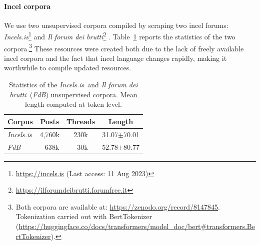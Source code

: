 \documentclass[11pt]{article}
\newcommand{\enforum}{\textit{Incels.is}}
\newcommand{\itforum}{\textit{Il forum dei brutti}}
\begin{document}
\paragraph{Incel corpora}
We use two unsupervised corpora compiled by scraping two incel forums: \textit{\enforum}\footnote{\url{https://incels.is} (Last access: 11 Aug 2023)} and \textit{\itforum}\footnote{\url{https://ilforumdeibrutti.forumfree.it}} \cite{gajo2023identification}.
Table~\ref{tab:english-italian-unsupervised-datasets-stats} reports the statistics of the two corpora.\footnote{Both corpora are available at: \url{https://zenodo.org/record/8147845}. Tokenization carried out with BertTokenizer (\url{https://huggingface.co/docs/transformers/model_doc/bert#transformers.BertTokenizer}).}
These resources were created both due to the lack of freely available incel corpora and the fact that incel language changes rapidly,
making it worthwhile to compile updated resources.

\renewcommand{\arraystretch}{0.9}

\begin{table}[t]
  \centering
  \caption{Statistics of the \enforum\, and \itforum\, (\textit{FdB}) unsupervised corpora. Mean length computed at token level.}
  \begin{tabular}{l|ccc}
      \hline
      \textbf{Corpus} & \textbf{Posts} & \textbf{Threads} & \textbf{Length} \\
      \hline
      \enforum & 4,760k & 230k & 31.07$\pm$70.01 \\
      \textit{FdB} & \,\,\,\,638k & \,\,\,30k & 52.78$\pm$80.77 \\
      \hline
  \end{tabular}
  \label{tab:english-italian-unsupervised-datasets-stats}
\end{table}
\end{document}
